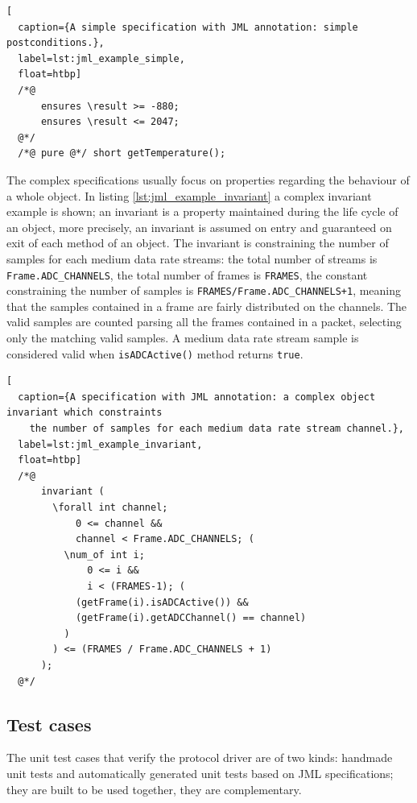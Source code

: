 \documentclass[english]{lni}
\newcommand{\lil}[1]{\texttt{\lstinline|#1|}}
\begin{document}
\begin{lstlisting}[
  caption={A simple specification with JML annotation: simple postconditions.},
  label=lst:jml_example_simple,
  float=htbp]
  /*@ 
      ensures \result >= -880; 
      ensures \result <= 2047; 
  @*/ 
  /*@ pure @*/ short getTemperature();
\end{lstlisting}

\sloppy

The complex specifications usually focus on properties regarding the behaviour of a whole object.
In listing \ref{lst:jml_example_invariant} a complex invariant example is shown; an invariant is a property maintained during the life cycle of an object, more precisely, an invariant is assumed on entry and guaranteed on exit of each method of an object. 
The invariant is constraining the number of samples for each medium data rate streams: the total number of streams is \lil{Frame.ADC_CHANNELS}, the total number of frames is \lil{FRAMES}, the constant constraining the number of samples is \lil{FRAMES/Frame.ADC_CHANNELS+1}, meaning that the samples contained in a frame are fairly distributed on the channels.
The valid samples are counted parsing all the frames contained in a packet, selecting only the matching valid samples.  
A medium data rate stream sample is considered valid when \lil{isADCActive()} method returns \lil{true}.

\fussy

\begin{lstlisting}[
  caption={A specification with JML annotation: a complex object invariant which constraints 
    the number of samples for each medium data rate stream channel.},
  label=lst:jml_example_invariant,
  float=htbp]
  /*@ 
      invariant ( 
        \forall int channel; 
            0 <= channel && 
            channel < Frame.ADC_CHANNELS; ( 
          \num_of int i; 
              0 <= i && 
              i < (FRAMES-1); (
            (getFrame(i).isADCActive()) && 
            (getFrame(i).getADCChannel() == channel)
          ) 
        ) <= (FRAMES / Frame.ADC_CHANNELS + 1) 
      ); 
  @*/
\end{lstlisting}



\subsection{Test cases}
\label{subsec:test_cases}

The unit test cases that verify the protocol driver are of two kinds: handmade unit tests and automatically generated unit tests based on JML specifications; they are built to be used together, they are complementary.  
\end{document}
